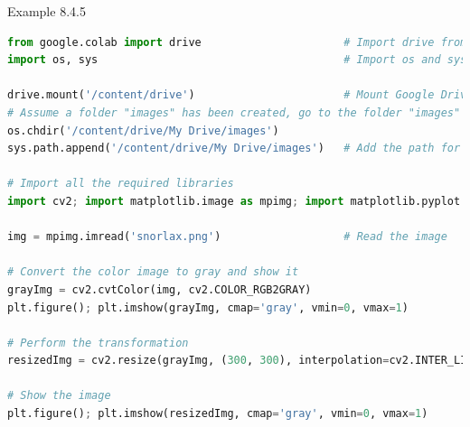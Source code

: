 \documentclass{book}
\begin{document}
\begin{egBox}{Example 8.4.5}{}
    \raggedright
    \begin{lstlisting}[language=Python, basicstyle=\ttfamily\small, keywordstyle=\color{blue}, commentstyle=\color{forestgreen}, stringstyle=\color{red}, showstringspaces=false]
from google.colab import drive                      # Import drive from google.colab package
import os, sys                                      # Import os and sys modules

drive.mount('/content/drive')                       # Mount Google Drive
# Assume a folder "images" has been created, go to the folder "images"
os.chdir('/content/drive/My Drive/images')
sys.path.append('/content/drive/My Drive/images')   # Add the path for interpreter to search

# Import all the required libraries
import cv2; import matplotlib.image as mpimg; import matplotlib.pyplot as plt

img = mpimg.imread('snorlax.png')                   # Read the image

# Convert the color image to gray and show it
grayImg = cv2.cvtColor(img, cv2.COLOR_RGB2GRAY)
plt.figure(); plt.imshow(grayImg, cmap='gray', vmin=0, vmax=1)

# Perform the transformation
resizedImg = cv2.resize(grayImg, (300, 300), interpolation=cv2.INTER_LINEAR)

# Show the image
plt.figure(); plt.imshow(resizedImg, cmap='gray', vmin=0, vmax=1)   


\end{lstlisting}
\end{egBox}
\end{document}
